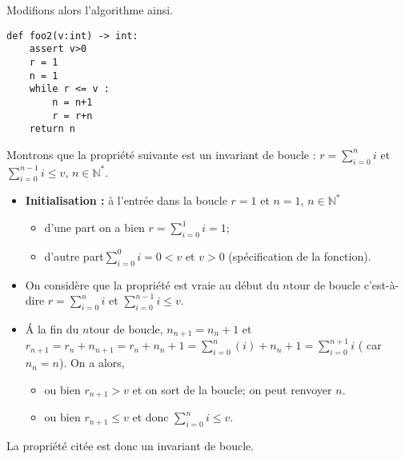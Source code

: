 Modifions alors l'algorithme ainsi.
\begin{lstlisting}
def foo2(v:int) -> int:
    assert v>0
    r = 1
    n = 1
    while r <= v : 
        n = n+1
        r = r+n
    return n
\end{lstlisting}

Montrons que la propriété suivante est un invariant de boucle : $r=\sum\limits_{i=0}^n i$ et 
$\sum\limits_{i=0}^{n-1} i \leq v$, 
$n\in\mathbb{N}^*$.

\begin{itemize}
\item \textbf{Initialisation : }à l'entrée dans la boucle $r=1$ et $n=1$, $n\in\mathbb{N}^*$
\begin{itemize}
\item d'une part  on a bien $r=\sum\limits_{i=0}^1 i = 1$;
\item d'autre part$  \sum\limits_{i=0}^{0}i =0 < v$ et $v>0$ (spécification de la fonction).
\end{itemize}
\item On considère que la propriété est vraie au début du $n$\ieme  tour de boucle c'est-à-dire $r=\sum\limits_{i=0}^n i$ et $\sum\limits_{i=0}^{n-1} i \leq v$.
\item \'A la fin du $n$\ieme  tour de boucle, $n_{n+1} = n_n+1$ et 
$r_{n+1} = r_n + n_{n+1}=r_n+n_n+1 = \sum\limits_{i=0}^n \left(i\right)+n_n+1  = \sum\limits_{i=0}^{n+1} i$ ( car $n_n = n$). 
On a alors, 
\begin{itemize}
\item ou bien $r_{n+1}>v$ et on sort de la boucle; on peut renvoyer $n$.
\item ou bien $r_{n+1}\leq v$ et donc $\sum\limits_{i=0}^{n} i \leq v$. 
\end{itemize}
%
\end{itemize}
La propriété citée est donc un invariant de boucle. 
%
